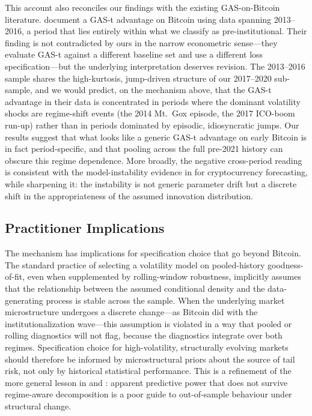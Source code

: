 This account also reconciles our findings with the existing GAS-on-Bitcoin literature. \citet{catania2017} document a GAS-t advantage on Bitcoin using data spanning 2013--2016, a period that lies entirely within what we classify as pre-institutional. Their finding is not contradicted by ours in the narrow econometric sense---they evaluate GAS-t against a different baseline set and use a different loss specification---but the underlying interpretation deserves revision. The 2013--2016 sample shares the high-kurtosis, jump-driven structure of our 2017--2020 sub-sample, and we would predict, on the mechanism above, that the GAS-t advantage in their data is concentrated in periods where the dominant volatility shocks are regime-shift events (the 2014 Mt.\ Gox episode, the 2017 ICO-boom run-up) rather than in periods dominated by episodic, idiosyncratic jumps. Our results suggest that what looks like a generic GAS-t advantage on early Bitcoin is in fact period-specific, and that pooling across the full pre-2021 history can obscure this regime dependence. More broadly, the negative cross-period reading is consistent with the model-instability evidence in \citet{catania2019} for cryptocurrency forecasting, while sharpening it: the instability is not generic parameter drift but a discrete shift in the appropriateness of the assumed innovation distribution.

\subsection{Practitioner Implications}

The mechanism has implications for specification choice that go beyond Bitcoin. The standard practice of selecting a volatility model on pooled-history goodness-of-fit, even when supplemented by rolling-window robustness, implicitly assumes that the relationship between the assumed conditional density and the data-generating process is stable across the sample. When the underlying market microstructure undergoes a discrete change---as Bitcoin did with the institutionalization wave---this assumption is violated in a way that pooled or rolling diagnostics will not flag, because the diagnostics integrate over both regimes. Specification choice for high-volatility, structurally evolving markets should therefore be informed by microstructural priors about the source of tail risk, not only by historical statistical performance. This is a refinement of the more general lesson in \citet{welch2008} and \citet{harvey2016}: apparent predictive power that does not survive regime-aware decomposition is a poor guide to out-of-sample behaviour under structural change.

